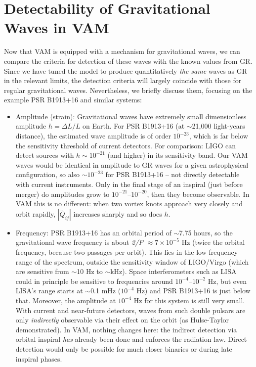 \section*{Detectability of Gravitational Waves in VAM}
Now that VAM is equipped with a mechanism for gravitational waves, we can compare the criteria for detection of these waves with the known values from GR. Since we have tuned the model to produce quantitatively \textit{the same} waves as GR in the relevant limits, the detection criteria will largely coincide with those for regular gravitational waves. Nevertheless, we briefly discuss them, focusing on the example PSR B1913+16 and similar systems:

\begin{itemize}
\item Amplitude (strain): Gravitational waves have extremely small dimensionless amplitude $h = ΔL/L$ on Earth. For PSR B1913+16 (at $\sim$21,000 light-years distance), the estimated wave amplitude is of order $10^{-23}$, which is far below the sensitivity threshold of current detectors. For comparison: LIGO can detect sources with $h \sim 10^{-21}$ (and higher) in its sensitivity band. Our VAM waves would be identical in amplitude to GR waves for a given astrophysical configuration, so also $\sim10^{-23}$ for PSR B1913+16 – not directly detectable with current instruments. Only in the final stage of an inspiral (just before merger) do amplitudes grow to $10^{-21}$–$10^{-20}$, then they become observable. In VAM this is no different: when two vortex knots approach very closely and orbit rapidly, $|\dddot{Q}_{ij}|$ increases sharply and so does $h$.

\item Frequency: PSR B1913+16 has an orbital period of $\sim$7.75 hours, so the gravitational wave frequency is about \textit{2/P} $\approx 7\times10^{-5}$ Hz (twice the orbital frequency, because two passages per orbit). This lies in the low-frequency range of the spectrum, outside the sensitivity window of LIGO/Virgo (which are sensitive from $\sim$10 Hz to $\sim$kHz). Space interferometers such as LISA could in principle be sensitive to frequencies around $10^{-4}$–$10^{-2}$ Hz, but even LISA’s range starts at $\sim$0.1 mHz ($10^{-4}$ Hz) and PSR B1913+16 is just below that. Moreover, the amplitude at $10^{-4}$ Hz for this system is still very small. With current and near-future detectors, waves from such double pulsars are only \textit{indirectly} observable via their effect on the orbit (as Hulse-Taylor demonstrated). In VAM, nothing changes here: the indirect detection via orbital inspiral \textit{has} already been done and enforces the radiation law. Direct detection would only be possible for much closer binaries or during late inspiral phases.


\end{itemize}

